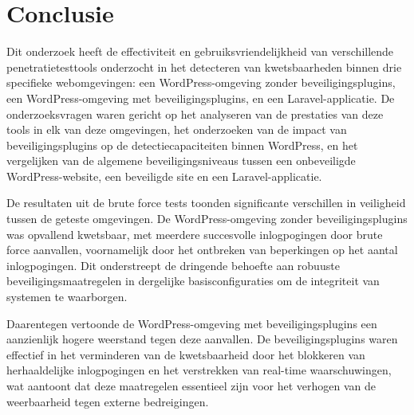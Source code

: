 
\chapter{Conclusie}%
\label{ch:conclusie}


Dit onderzoek heeft de effectiviteit en gebruiksvriendelijkheid van verschillende penetratietesttools onderzocht in het 
detecteren van kwetsbaarheden binnen drie specifieke webomgevingen: een WordPress-omgeving zonder beveiligingsplugins, 
een WordPress-omgeving met beveiligingsplugins, en een Laravel-applicatie. De onderzoeksvragen waren gericht op het 
analyseren van de prestaties van deze tools in elk van deze omgevingen, het onderzoeken van de impact van beveiligingsplugins 
op de detectiecapaciteiten binnen WordPress, en het vergelijken van de algemene beveiligingsniveaus tussen een onbeveiligde 
WordPress-website, een beveiligde site en een Laravel-applicatie.

De resultaten uit de brute force tests toonden significante verschillen in veiligheid tussen de geteste omgevingen. 
De WordPress-omgeving zonder beveiligingsplugins was opvallend kwetsbaar, met meerdere succesvolle inlogpogingen door 
brute force aanvallen, voornamelijk door het ontbreken van beperkingen op het aantal inlogpogingen. Dit onderstreept 
de dringende behoefte aan robuuste beveiligingsmaatregelen in dergelijke basisconfiguraties om de integriteit van 
systemen te waarborgen.

Daarentegen vertoonde de WordPress-omgeving met beveiligingsplugins een aanzienlijk hogere weerstand tegen deze 
aanvallen. De beveiligingsplugins waren effectief in het verminderen van de kwetsbaarheid door het blokkeren van 
herhaaldelijke inlogpogingen en het verstrekken van real-time waarschuwingen, wat aantoont dat deze maatregelen 
essentieel zijn voor het verhogen van de weerbaarheid tegen externe bedreigingen.

